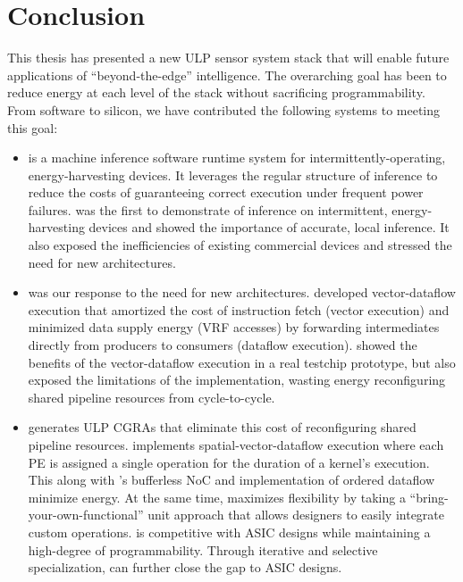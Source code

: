 \chapter{Conclusion}
\label{chapter:conclusion}
This thesis has presented a new ULP sensor system stack that will enable future applications of ``beyond-the-edge'' intelligence.
%
The overarching goal has been to reduce energy at each level of the stack without sacrificing programmability.
%
From software to silicon, we have contributed the following systems to meeting this goal:
%

\begin{itemize}

\item \sonic is a machine inference software runtime system for intermittently-operating, energy-harvesting devices.
% 
It leverages the regular structure of inference to reduce the costs of guaranteeing correct execution under frequent power failures.
% 
\sonic was the first to demonstrate of inference on intermittent, energy-harvesting devices and showed the importance of accurate, local inference.
% 
It also exposed the inefficiencies of existing commercial devices and stressed the need for new architectures.

\item \manic was our response to the need for new architectures.
% 
\manic developed vector-dataflow execution that amortized the cost of instruction fetch (vector execution) and minimized data supply energy (VRF accesses) by forwarding intermediates directly from producers to consumers (dataflow execution).
% 
\msilicon showed the benefits of the vector-dataflow execution in a real testchip prototype, but also exposed the limitations of the implementation, wasting energy reconfiguring shared pipeline resources from cycle-to-cycle.

\item \snafu generates ULP CGRAs that eliminate this cost of reconfiguring shared pipeline resources.
% 
\snafu implements spatial-vector-dataflow execution where each PE is assigned a single operation for the duration of a kernel's execution.
% 
This along with \snafu's bufferless NoC and implementation of ordered dataflow minimize energy.
% 
At the same time, \snafu maximizes flexibility by taking a ``bring-your-own-functional'' unit approach that allows designers to easily integrate custom operations.
% 
\snafu is competitive with ASIC designs while maintaining a high-degree of programmability.
% 
Through iterative and selective specialization, \snafu can further close the gap to ASIC designs.


\end{itemize}
